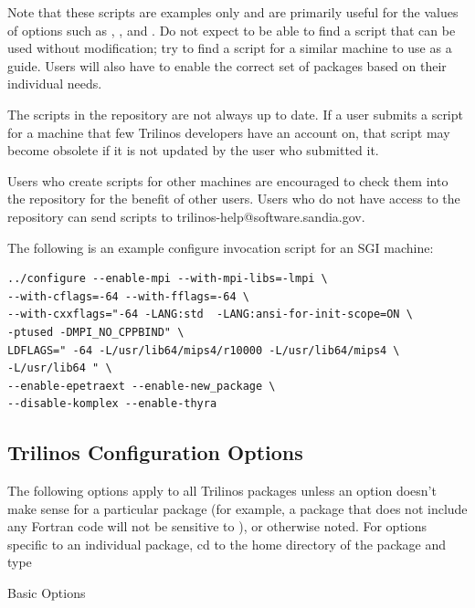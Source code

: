 \begin{enumerate}
Note that these scripts 
are examples only and are primarily useful for the values of options such as 
, , 
and .  Do not expect to be able to find a 
script that can be used without modification; try to find a script for a 
similar machine to use as a guide.  Users will also have to enable
the correct set of packages based on their individual needs. 

The scripts in the 
repository are not always up to date.  If a user submits a script for a 
machine that few Trilinos developers have an account on, that script may 
become obsolete if it is not updated by the user who submitted it.

Users who create scripts for other machines are encouraged to check them into 
the repository for the benefit of other users.  Users who do not have access to
the repository can send scripts to trilinos-help@software.sandia.gov.

The following is an example configure invocation script for an SGI machine:

\begin{verbatim}
../configure --enable-mpi --with-mpi-libs=-lmpi \
--with-cflags=-64 --with-fflags=-64 \
--with-cxxflags="-64 -LANG:std  -LANG:ansi-for-init-scope=ON \
-ptused -DMPI_NO_CPPBIND" \
LDFLAGS=" -64 -L/usr/lib64/mips4/r10000 -L/usr/lib64/mips4 \
-L/usr/lib64 " \
--enable-epetraext --enable-new_package \
--disable-komplex --enable-thyra
\end{verbatim}
\end{enumerate}

\subsection{Trilinos Configuration Options}
\label{subsect:TrilinosConfigOptions}
The following options apply to all Trilinos packages unless 
an option doesn't make sense for a particular package (for example, a 
package that does not include any Fortran code will not be sensitive to 
), or otherwise noted.  For options specific to 
an individual package, cd to the home directory of the 
package and type 

Basic Options

